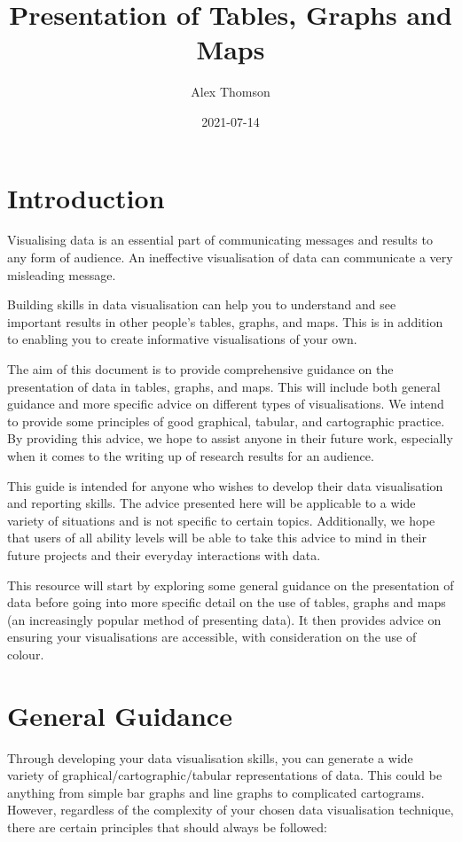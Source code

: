 \documentclass[
]{book}
\title{Presentation of Tables, Graphs and Maps}
\author{Alex Thomson}
\date{2021-07-14}
\begin{document}
\maketitle

{
\setcounter{tocdepth}{1}
\tableofcontents
}
\hypertarget{introduction}{%
\chapter{Introduction}\label{introduction}}

Visualising data is an essential part of communicating messages and results to any form of audience. An ineffective visualisation of data can communicate a very misleading message.

Building skills in data visualisation can help you to understand and see important results in other people's tables, graphs, and maps. This is in addition to enabling you to create informative visualisations of your own.

The aim of this document is to provide comprehensive guidance on the presentation of data in tables, graphs, and maps. This will include both general guidance and more specific advice on different types of visualisations. We intend to provide some principles of good graphical, tabular, and cartographic practice. By providing this advice, we hope to assist anyone in their future work, especially when it comes to the writing up of research results for an audience.

This guide is intended for anyone who wishes to develop their data visualisation and reporting skills. The advice presented here will be applicable to a wide variety of situations and is not specific to certain topics. Additionally, we hope that users of all ability levels will be able to take this advice to mind in their future projects and their everyday interactions with data.

This resource will start by exploring some general guidance on the presentation of data before going into more specific detail on the use of tables, graphs and maps (an increasingly popular method of presenting data). It then provides advice on ensuring your visualisations are accessible, with consideration on the use of colour.

\hypertarget{gg}{%
\chapter{General Guidance}\label{gg}}

Through developing your data visualisation skills, you can generate a wide variety of graphical/cartographic/tabular representations of data. This could be anything from simple bar graphs and line graphs to complicated cartograms. However, regardless of the complexity of your chosen data visualisation technique, there are certain principles that should always be followed:
\end{document}
